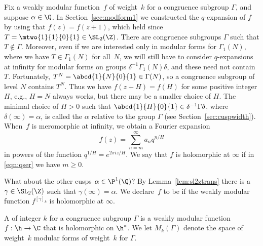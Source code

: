 Fix a weakly modular function~$f$ of weight~$k$ for a congruence
subgroup $\Gamma$, and suppose $\alpha \in \Q$.  In
Section~\ref{sec:modform1} we constructed the $q$-expansion of $f$ by
using that $f(z) = f(z+1)$, which held since
$T=\mtwo{1}{1}{0}{1}\in\SL_2(\Z)$.  There are
congruence subgroups $\Gamma$ such that $T\not\in\Gamma$.  Moreover,
even if we are interested only in modular forms for $\Gamma_1(N)$,
where we have $T\in\Gamma_1(N)$ for all~$N$, we will still have to
consider $q$-expansions at infinity for modular forms on groups
$\delta^{-1} \Gamma_1(N)\delta$, and these need not contain~$T$.
Fortunately, $T^N = \abcd{1}{N}{0}{1} \in \Gamma(N)$, so a congruence
subgroup of level $N$ contains $T^N$.  Thus we have
$f(z+H) = f(H)$ for some positive integer $H$, e.g., $H=N$
always works, but there may be a smaller choice of $H$.
The minimal choice of $H>0$ such that
$\abcd{1}{H}{0}{1}\in \delta^{-1}\Gamma\delta$,
where $\delta(\infty)=\alpha$,
is called the 
$\alpha$ relative to the group $\Gamma$ (see Section~\ref{sec:cuspwidth}).
When~$f$ is meromorphic at infinity, we obtain 
a Fourier expansion
\begin{equation}\label{eqn:qser}
   f(z) = \sum_{n=m}^{\infty} a_n q^{n/H}
\end{equation}
in powers of the function $q^{1/H} = e^{2 \pi i z
  /H}$.  We say that $f$ is holomorphic at $\infty$ if in
\eqref{eqn:qser} we have $m\geq 0$.  

What about the other cusps $\alpha\in\P^1(\Q)$? By
Lemma~\ref{lem:sl2ztrans} there is a $\gamma\in\SL_2(\Z)$ such that
$\gamma(\infty)=\alpha$.  We declare~$f$ to be  if the weakly modular function $f^{[\gamma]_k}$ is
holomorphic at $\infty$. 

\begin{definition}
A  of integer  $k$ for a congruence subgroup
$\Gamma$ is a weakly modular function $f:\h\to \C$ that
is holomorphic on $\h^*$.  We let $M_k(\Gamma)$ 
denote the space
of weight~$k$ modular forms of weight~$k$ for $\Gamma$.
\end{definition}


